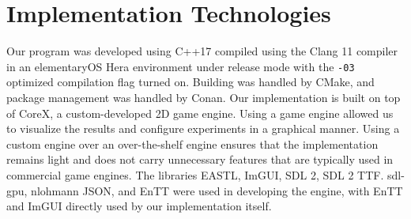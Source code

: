 \section{Implementation Technologies}
Our program was developed using C++17 compiled using the Clang 11 compiler in an elementaryOS Hera environment under release mode with the \texttt{-03} optimized compilation flag turned on. Building was handled by CMake, and package management was handled by Conan. Our implementation is built on top of CoreX, a custom-developed 2D game engine. Using a game engine allowed us to visualize the results and configure experiments in a graphical manner. Using a custom engine over an over-the-shelf engine ensures that the implementation remains light and does not carry unnecessary features that are typically used in commercial game engines. The libraries EASTL, ImGUI, SDL 2, SDL 2 TTF. sdl-gpu, nlohmann JSON, and EnTT were used in developing the engine, with EnTT and ImGUI directly used by our implementation itself.